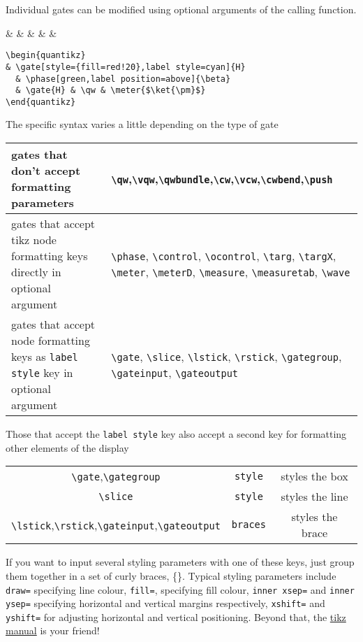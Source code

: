 \documentclass[aps,pra,10pt,nofootinbib]{revtex4}
\begin{document}
Individual gates can be modified using optional arguments of the calling function. 
\begin{Code}
\begin{center}
\begin{quantikz}
&  & \phase[green,label position=above]{\beta} &  & \qw & \meter{$\ket{\pm}$}
\end{quantikz}
\end{center}
\tcblower
\begin{lstlisting}
\begin{quantikz}
& \gate[style={fill=red!20},label style=cyan]{H} 
  & \phase[green,label position=above]{\beta} 
  & \gate{H} & \qw & \meter{$\ket{\pm}$}
\end{quantikz}
\end{lstlisting}
\end{Code}
The specific syntax varies a little depending on the type of gate
\begin{center}
\begin{tabular}{p{}|p{}}
gates that don't accept formatting parameters & \verb!\qw!,\verb!\vqw!,\verb!\qwbundle!,\verb!\cw!,\verb!\vcw!,\verb!\cwbend!,\verb!\push!	\\
\hline
gates that accept tikz node formatting keys directly in optional argument & \verb!\phase!, \verb!\control!, \verb!\ocontrol!, \verb!\targ!, \verb!\targX!, \verb!\meter!, \verb!\meterD!, \verb!\measure!, \verb!\measuretab!, \verb!\wave! \\
\hline
gates that accept node formatting keys as \verb!label style! key in optional argument & \verb!\gate!, \verb!\slice!, \verb!\lstick!, \verb!\rstick!, \verb!\gategroup!, \verb!\gateinput!, \verb!\gateoutput!
\end{tabular}
\end{center}
Those that accept the \verb!label style! key also accept a second key for formatting other elements of the display
\begin{center}
\begin{tabular}{c|cc}
\verb!\gate!,\verb!\gategroup! & \verb!style! & styles the box	\\
\verb!\slice! & \verb!style! & styles the line\\
\verb!\lstick!,\verb!\rstick!,\verb!\gateinput!,\verb!\gateoutput! & \verb!braces! & styles the brace
\end{tabular}
\end{center}
If you want to input several styling parameters with one of these keys, just group them together in a set of curly braces, \{\}. Typical styling parameters include \verb!draw=! specifying line colour, \verb!fill=!, specifying fill colour, \verb!inner xsep=! and \verb!inner ysep=! specifying horizontal and vertical margins respectively, \verb!xshift=! and \verb!yshift=! for adjusting horizontal and vertical positioning. Beyond that, the \href{http://mirrors.ctan.org/graphics/pgf/base/doc/pgfmanual.pdf}{tikz manual} is your friend!
\end{document}
